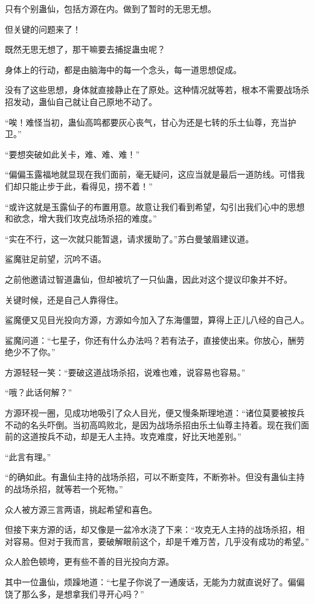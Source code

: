 \begin{this_body}
只有个别蛊仙，包括方源在内。做到了暂时的无思无想。

但关键的问题来了！

既然无思无想了，那干嘛要去捕捉蛊虫呢？

身体上的行动，都是由脑海中的每一个念头，每一道思想促成。

没有了这些思想，身体就直接静止在了原处。这种情况就等若，根本不需要战场杀招发动，蛊仙自己就让自己原地不动了。

“唉！难怪当初，蛊仙高鸣都要灰心丧气，甘心为还是七转的乐土仙尊，充当护卫。”

“要想突破如此关卡，难、难、难！”

“偏偏玉露福地就显现在我们面前，毫无疑问，这应当就是最后一道防线。可惜我们却只能止步于此，看得见，捞不着！”

“或许这就是玉露仙子的布置用意。故意让我们看到希望，勾引出我们心中的思想和欲念，增大我们攻克战场杀招的难度。”

“实在不行，这一次就只能暂退，请求援助了。”苏白曼皱眉建议道。

鲨魔驻足前望，沉吟不语。

之前他邀请过智道蛊仙，但却被坑了一只仙蛊，因此对这个提议印象并不好。

关键时候，还是自己人靠得住。

鲨魔便又见目光投向方源，方源如今加入了东海僵盟，算得上正儿八经的自己人。

鲨魔问道：“七星子，你还有什么办法吗？若有法子，直接使出来。你放心，酬劳绝少不了你。”

方源轻轻一笑：“要破这道战场杀招，说难也难，说容易也容易。”

“哦？此话何解？”

方源环视一圈，见成功地吸引了众人目光，便又慢条斯理地道：“诸位莫要被按兵不动的名头吓倒。当初高鸣败北，是因为战场杀招由乐土仙尊主持着。现在我们面前的这道按兵不动，却是无人主持。攻克难度，好比天地差别。”

“此言有理。”

“的确如此。有蛊仙主持的战场杀招，可以不断变阵，不断弥补。但没有蛊仙主持的战场杀招，就等若一个死物。”

众人被方源三言两语，挑起希望和喜色。

但接下来方源的话，却又像是一盆冷水浇了下来：“攻克无人主持的战场杀招，相对容易。但对于我而言，要破解眼前这个，却是千难万苦，几乎没有成功的希望。”

众人脸色顿垮，更有些不善的目光投向方源。

其中一位蛊仙，烦躁地道：“七星子你说了一通废话，无能为力就直说好了。偏偏饶了那么多，是想拿我们寻开心吗？”


\end{this_body}
